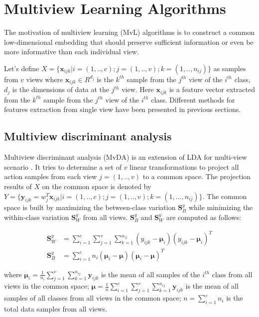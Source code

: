
\section{Multiview Learning Algorithms}

    The motivation of multiview learning (MvL) algorithms is to construct a common low-dimensional embedding that should preserve sufficient information or even be more informative than each individual view.

    Let's define $X = \{\boldsymbol{x}_{ijk}|i=(1,..,c);j = (1,..,v);k=(1,..,n_{ij})\}$ as samples from $v$ views where $\boldsymbol{x}_{ijk} \in R^{d_j}$ is the $k^{th}$ sample from the $j^{th}$ view of the $i^{th}$ class, $d_j$ is the dimensions of data at the $j^{th}$ view.
    Here ${\boldsymbol x}_{ijk}$ is a feature vector extracted from the $k^{th}$ sample from the $j^{th}$ view of the $i^{th}$ class.
    Different methods for features extraction from single view have been presented in previous sections. 

    \subsection{Multiview discriminant analysis}
        Multiview discriminant analysis (MvDA) is an extension of LDA for multi-view scenario \cite{kan2015multi}.
        It tries to determine a set of $v$ linear transformations to project all action samples from each view $j = (1,..,v)$ to a common space.
        The projection results of $X$ on the common space is denoted by $Y = \{\boldsymbol{y}_{ijk} = w_j^T\boldsymbol{x}_{ijk}|i=(1,..,c); j=(1,..,v); k=(1,...,n_{ij})\}$.
        The common space is built by maximizing the between-class variation $\boldsymbol{S}_B^y$ while minimizing the within-class variation $\boldsymbol{S}_W^y$ from all views. $\boldsymbol{S}_B^y$ and $\boldsymbol{S}_W^y$ are computed as follows: 

        \begin{align}
            \boldsymbol{S}_W^y &= \sum_{i=1}^{c}\sum_{j=1}^{v}\sum_{k=1}^{n_{ij}}(y_{ijk}-\boldsymbol{\mu}_i)(y_{ijk}-\boldsymbol{\mu}_i)^T \label{eq:MvDA_Sw}\\
            \boldsymbol{S}_B^y &= \sum_{i=1}^{c}n_i(\boldsymbol{\mu}_i - \boldsymbol{\mu})(\boldsymbol{\mu}_i - \boldsymbol{\mu})^T \label{eq:MvDA_Sb}
        \end{align}

        where $\boldsymbol{\mu}_i=\frac{1}{n_i}\sum_{j=1}^{v}{\sum_{k=1}^{n_{ij}}}{\boldsymbol{y}_{ijk}}$ is the mean of all samples of the $i^{th}$ class from all views in the common space; $\boldsymbol{\mu}=\frac{1}{n}\sum_{i=1}^{c}\sum_{j=1}^{v}{\sum_{k=1}^{n_{ij}}{\boldsymbol{y}_{ijk}}}$ is the mean of all samples of all classes from all views in the common space; $n=\sum_{i=1}^{c}n_i$ is the total data samples from all views.

